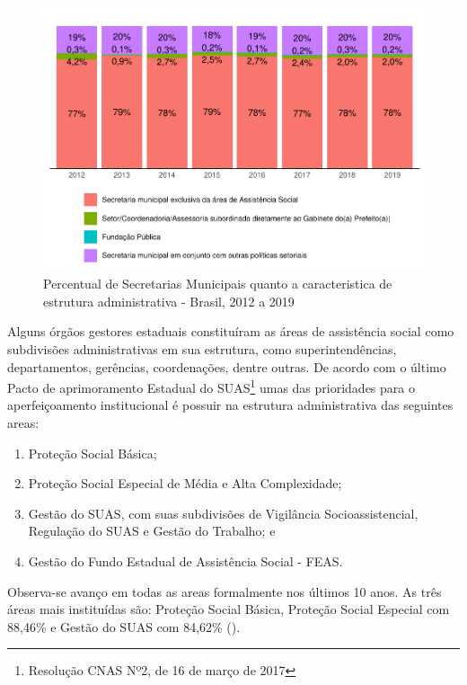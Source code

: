 \documentclass[
  brazilian]{report}
\providecommand{\tightlist}{%
  \setlength{\itemsep}{0pt}\setlength{\parskip}{0pt}}
\begin{document}
\begin{figure}
\includegraphics{Censo-SUAS-2022_files/figure-latex/sec-munic-exc-1} \caption[Percentual de Secretarias Municipais quanto a caracteristica de estrutura administrativa - Brasil, 2012 a 2019]{Percentual de Secretarias Municipais quanto a caracteristica de estrutura administrativa - Brasil, 2012 a 2019}\label{fig:sec-munic-exc}
\end{figure}

Alguns órgãos gestores estaduais constituíram as áreas de assistência
social como subdivisões administrativas em sua estrutura, como
superintendências, departamentos, gerências, coordenações, dentre
outras. De acordo com o último Pacto de aprimoramento Estadual do
SUAS\footnote{Resolução CNAS Nº2, de 16 de março de 2017} umas das
prioridades para o aperfeiçoamento institucional é possuir na estrutura
administrativa das seguintes areas:

\begin{enumerate}
\def\labelenumi{\arabic{enumi})}
\tightlist
\item
  Proteção Social Básica;
\item
  Proteção Social Especial de Média e Alta Complexidade;
\item
  Gestão do SUAS, com suas subdivisões de Vigilância Socioassistencial,
  Regulação do SUAS e Gestão do Trabalho; e
\item
  Gestão do Fundo Estadual de Assistência Social - FEAS.
\end{enumerate}

Observa-se avanço em todas as areas formalmente nos últimos 10 anos. As
três áreas mais instituídas são: Proteção Social Básica, Proteção Social
Especial com 88,46\% e Gestão do SUAS com 84,62\% ().
\end{document}
